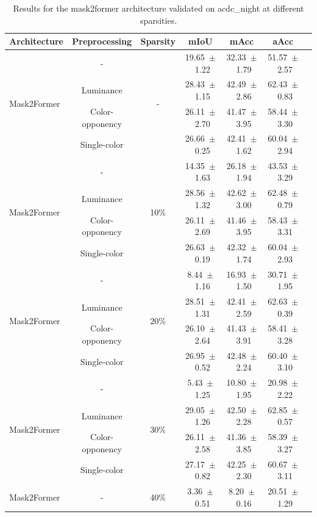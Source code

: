 \begin{table}[h]
\centering
\caption{Results for the mask2former architecture validated on acdc_night at different sparsities.}
\begin{tabular}{@{}lccc ccc@{}}
\toprule
Architecture & Preprocessing & Sparsity & mIoU & mAcc & aAcc \\
\midrule

\multirow{4}{*}{Mask2Former} & - & \multirow{4}{*}{-} & 19.65~$\pm$~1.22 & 32.33~$\pm$~1.79 & 51.57~$\pm$~2.57 \\
& Luminance & & 28.43~$\pm$~1.15 & 42.49~$\pm$~2.86 & 62.43~$\pm$~0.83 \\
& Color-opponency & & 26.11~$\pm$~2.70 & 41.47~$\pm$~3.95 & 58.44~$\pm$~3.30 \\
& Single-color & & 26.66~$\pm$~0.25 & 42.41~$\pm$~1.62 & 60.04~$\pm$~2.94 \\
\midrule
\multirow{4}{*}{Mask2Former} & - & \multirow{4}{*}{10\%} & 14.35~$\pm$~1.63 & 26.18~$\pm$~1.94 & 43.53~$\pm$~3.29 \\
& Luminance & & 28.56~$\pm$~1.32 & 42.62~$\pm$~3.00 & 62.48~$\pm$~0.79 \\
& Color-opponency & & 26.11~$\pm$~2.69 & 41.46~$\pm$~3.95 & 58.43~$\pm$~3.31 \\
& Single-color & & 26.63~$\pm$~0.19 & 42.32~$\pm$~1.74 & 60.04~$\pm$~2.93 \\
\midrule
\multirow{4}{*}{Mask2Former} & - & \multirow{4}{*}{20\%} & 8.44~$\pm$~1.16 & 16.93~$\pm$~1.50 & 30.71~$\pm$~1.95 \\
& Luminance & & 28.51~$\pm$~1.31 & 42.41~$\pm$~2.59 & 62.63~$\pm$~0.39 \\
& Color-opponency & & 26.10~$\pm$~2.64 & 41.43~$\pm$~3.91 & 58.41~$\pm$~3.28 \\
& Single-color & & 26.95~$\pm$~0.52 & 42.48~$\pm$~2.24 & 60.40~$\pm$~3.10 \\
\midrule
\multirow{4}{*}{Mask2Former} & - & \multirow{4}{*}{30\%} & 5.43~$\pm$~1.25 & 10.80~$\pm$~1.95 & 20.98~$\pm$~2.22 \\
& Luminance & & 29.05~$\pm$~1.26 & 42.50~$\pm$~2.28 & 62.85~$\pm$~0.57 \\
& Color-opponency & & 26.11~$\pm$~2.58 & 41.36~$\pm$~3.85 & 58.39~$\pm$~3.27 \\
& Single-color & & 27.17~$\pm$~0.82 & 42.25~$\pm$~2.30 & 60.67~$\pm$~3.11 \\
\midrule
\multirow{4}{*}{Mask2Former} & - & \multirow{4}{*}{40\%} & 3.36~$\pm$~0.51 & 8.20~$\pm$~0.16 & 20.51~$\pm$~1.29 \\

\end{tabular}
\end{table}
